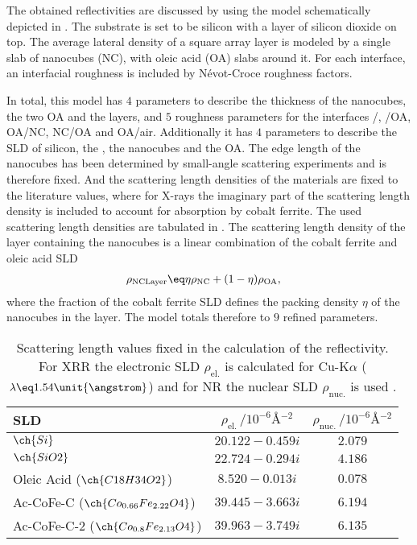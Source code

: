 \documentclass[\main/dresen_thesis.tex]{subfiles}
\begin{document}
    The obtained reflectivities are discussed by using the model schematically depicted in .
    The substrate is set to be silicon with a layer of silicon dioxide on top.
    The average lateral density of a square array layer is modeled by a single slab of nanocubes (NC), with oleic acid (OA) slabs around it.
    For each interface, an interfacial roughness is included by Névot-Croce roughness factors.

    In total, this model has $4$ parameters to describe the thickness of the nanocubes, the two OA and the  layers, and $5$ roughness parameters for the interfaces /, /OA, OA/NC, NC/OA  and OA/air.
    Additionally it has $4$ parameters to describe the SLD of silicon, the , the nanocubes and the OA.
    The edge length of the nanocubes has been determined by small-angle scattering experiments and is therefore fixed.
    And the scattering length densities of the materials are fixed to the literature values, where for X-rays the imaginary part of the scattering length density is included to account for absorption by cobalt ferrite.
    The used scattering length densities are tabulated in .
    The scattering length density of the layer containing the nanocubes is a linear combination of the cobalt ferrite and oleic acid SLD
    \begin{align}
      \rho_\mathrm{NC Layer}  &\eq  \eta \rho_\mathrm{NC} + (1 - \eta) \rho_\mathrm{OA},
    \end{align}
    where the fraction of the cobalt ferrite SLD defines the packing density $\eta$ of the nanocubes in the layer.
    The model totals therefore to $9$ refined parameters.

    \begin{table}[ht]
      \centering
      \caption{\label{tab:monolayers:charMethod:reflectometryScatteringLenghts}Scattering length values fixed in the calculation of the reflectivity. For XRR the electronic SLD $\rho_\mathrm{el.}$ is calculated for Cu-K$\alpha$ ($\lambda \eq 1.54 \unit{\angstrom}$) and for NR the nuclear SLD $\rho_\mathrm{nuc.}$ is used \cite{Sears_1992_Neutr, BerkeleyLab_1993_asf}.}
      \begin{tabular}{ l | c | c }
        \textbf{SLD}  & $\rho_\mathrm{el.} \, / \unit{10^{-6} \angstrom^{-2}}$ & $\rho_\mathrm{nuc.} \, / \unit{10^{-6} \angstrom^{-2}}$ \\
        \hline
        $\ch{Si}$                                 & $20.122 - 0.459 i$   & $2.079$  \\
        $\ch{SiO2}$                               & $22.724 - 0.294 i$   & $4.186$  \\
        Oleic Acid ($\ch{C18H34O2}$)              & $8.520  - 0.013 i$   & $0.078$  \\
        Ac-CoFe-C ($\ch{Co_{0.66}Fe_{2.22}O4}$)   & $39.445 - 3.663 i$   & $6.194$  \\
        Ac-CoFe-C-2 ($\ch{Co_{0.8} Fe_{2.13}O4}$) & $39.963 - 3.749 i$   & $6.135$  \\
        \hline
      \end{tabular}
    \end{table}
\end{document}

